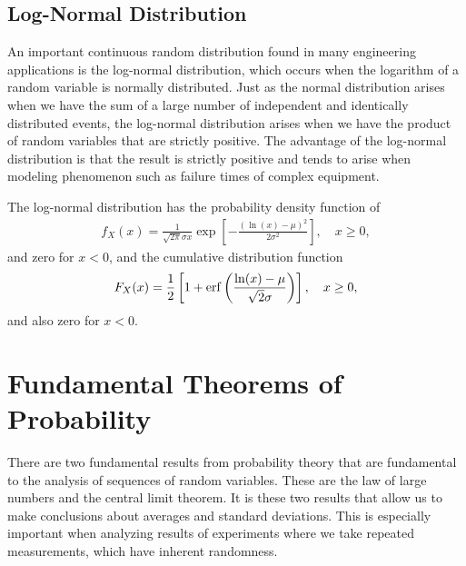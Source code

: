 \subsection{Log-Normal Distribution}

An important continuous random distribution found in many engineering applications is the log-normal distribution, which occurs when the logarithm of a random variable is normally distributed. Just as the normal distribution arises when we have the sum of a large number of independent and identically distributed events, the log-normal distribution arises when we have the product of random variables that are strictly positive. The advantage of the log-normal distribution is that the result is strictly positive and tends to arise when modeling phenomenon such as failure times of complex equipment.

The log-normal distribution has the probability density function of
\begin{align}
   f_X(x) = \frac{1}{\sqrt{2\pi}\sigma x} \exp \left[ - \frac{ ( \ln(x) - \mu )^2 }{ 2 \sigma^2 } \right] , \quad x \ge 0,
\end{align}
and zero for $x < 0$, and the cumulative distribution function
\begin{align}
  F_X(x) = \frac{1}{2} \left[ 1 + \mathrm{erf} \left( \frac{ \ln(x) - \mu }{ \sqrt{2} \sigma } \right) \right] , \quad x \ge 0,
\end{align}
and also zero for $x < 0$.

\section{Fundamental Theorems of Probability}

There are two fundamental results from probability theory that are fundamental to the analysis of sequences of random variables. These are the law of large numbers and the central limit theorem. It is these two results that allow us to make conclusions about averages and standard deviations. This is especially important when analyzing results of experiments where we take repeated measurements, which have inherent randomness.

